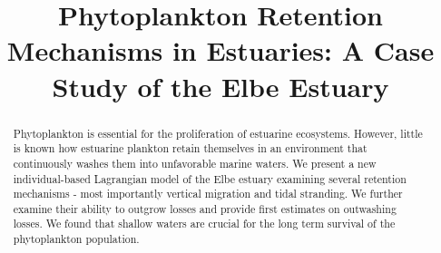 \documentclass[npg, manuscript]{copernicus}
\begin{document}
\title{Phytoplankton Retention Mechanisms in Estuaries: A Case Study of the Elbe Estuary}
















\received{}
\pubdiscuss{} %
\revised{}
\accepted{}
\published{}




\maketitle



\begin{abstract}
    Phytoplankton is essential for the proliferation of estuarine ecosystems.
    However, little is known how estuarine plankton retain themselves in an environment that continuously washes them into unfavorable marine waters.
    We present a new individual-based Lagrangian model of the Elbe estuary examining several retention mechanisms - most importantly vertical migration and tidal stranding.
    We further examine their ability to outgrow losses and provide first estimates on outwashing losses.
    We found that shallow waters are crucial for the long term survival of the phytoplankton population.
\end{abstract}
\end{document}
